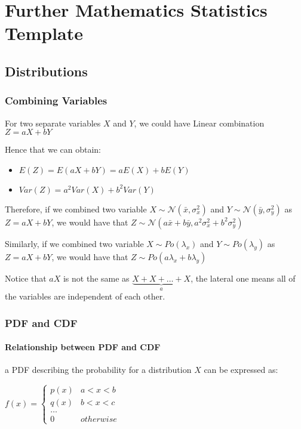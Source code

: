 \documentclass[]{article}
\date{}
\let\oldparagraph\paragraph
\renewcommand{\paragraph}[1]{\oldparagraph{#1}\mbox{}}
\begin{document}
\section{Further Mathematics Statistics Template}\label{header-n0}

\subsection{Distributions}\label{header-n2}

\subsubsection{Combining Variables}\label{header-n3}

For two separate variables \(X\) and \(Y\), we could have Linear
combination \(Z = aX + bY\)

Hence that we can obtain:

\begin{itemize}
\item
  \(E(Z) = E(aX + bY) = aE(X) + bE(Y)\)
\item
  \(Var(Z) = a^2Var(X) + b^2Var(Y)\)
\end{itemize}

Therefore, if we combined two variable
\(X \sim \mathcal{N}(\bar{x},\sigma_x^2)\) and
\(Y \sim \mathcal{N}(\bar{y},\sigma_y^2)\) as \(Z = aX + bY\), we would
have that
\(Z \sim \mathcal{N}(a\bar{x} + b\bar{y},a^2\sigma_x^2 + b^2\sigma_y^2)\)

Similarly, if we combined two variable \(X\sim Po(\lambda_x)\) and
\(Y\sim Po(\lambda_y)\) as \(Z = aX + bY\), we would have that
\(Z \sim Po(a\lambda_x+b\lambda_y)\)

Notice that \(aX\) is not the same as \(\underbrace{X+X+ \dots + X}_a\),
the lateral one means all of the variables are independent of each
other.

\subsubsection{PDF and CDF}\label{header-n14}

\paragraph{Relationship between PDF and CDF}\label{header-n15}

a PDF describing the probability for a distribution \(X\) can be
expressed as:

\(f(x) = \begin{cases}p(x) &a<x<b\\q(x)&b<x<c\\\dots\\0  & otherwise\end{cases}\)
\end{document}

